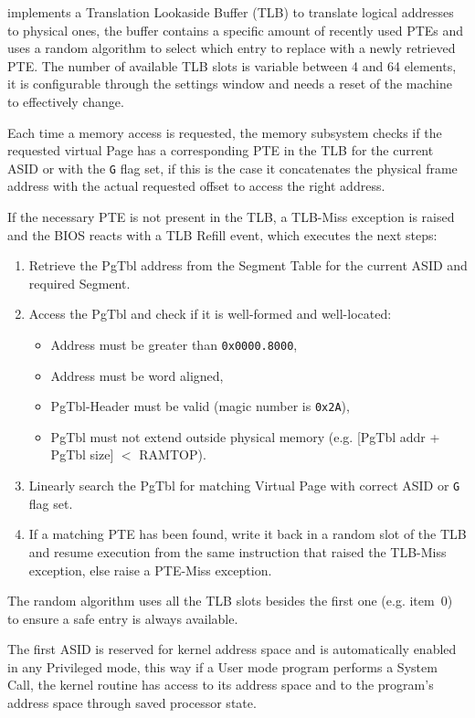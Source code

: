 \vspace{5px}
\begin{adjustbox}{center}

\end{adjustbox}
\vspace{5px}


\uarm{} implements a Translation Lookaside Buffer (TLB) to translate logical addresses to physical ones, the buffer contains a specific amount of recently used PTEs and uses a random algorithm to select which entry to replace with a newly retrieved PTE.
The number of available TLB slots is variable between 4 and 64 elements, it is configurable through the settings window and needs a reset of the machine to effectively change.

Each time a memory access is requested, the memory subsystem checks if the requested virtual Page has a corresponding PTE in the TLB for the current ASID or with the \texttt{G} flag set, if this is the case it concatenates the physical frame address with the actual requested offset to access the right address.

If the necessary PTE is not present in the TLB, a TLB-Miss exception is raised and the BIOS reacts with a TLB Refill event, which executes the next steps:
\begin{enumerate}
\item Retrieve the PgTbl address from the Segment Table for the current ASID and required Segment.
\item Access the PgTbl and check if it is well-formed and well-located:
	\begin{itemize}
	\item Address must be greater than \texttt{0x0000.8000},
	\item Address must be word aligned,
	\item PgTbl-Header must be valid (magic number is \texttt{0x2A}),
	\item PgTbl must not extend outside physical memory (e.g. [PgTbl addr + PgTbl size] $<$ RAMTOP).
	\end{itemize}
\item Linearly search the PgTbl for matching Virtual Page with correct ASID or \texttt{G} flag set.
\item If a matching PTE has been found, write it back in a random slot of the TLB and resume execution from the same instruction that raised the TLB-Miss exception, else raise a PTE-Miss exception.
\end{enumerate}

The random algorithm uses all the TLB slots besides the first one (e.g. item~0) to ensure a safe entry is always available.

The first ASID is reserved for kernel address space and is automatically enabled in any Privileged mode, this way if a User mode program performs a System Call, the kernel routine has access to its address space and to the program's address space through saved processor state.


